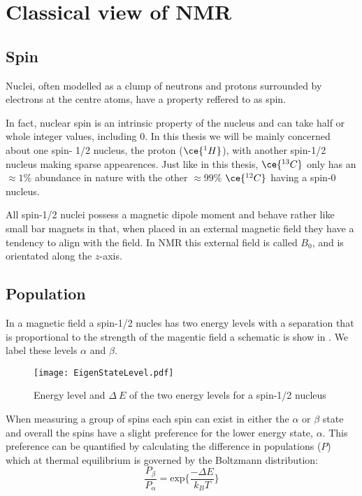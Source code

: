 
\section{Classical view of NMR}

\subsection{Spin}

Nuclei, often modelled as a clump of neutrons and protons surrounded by electrons at
the centre atoms, have a property reffered to as spin.

In fact, nuclear spin is an intrinsic property of the nucleus and can take half or whole
integer values, including $0$. In this thesis we will be mainly concerned about one spin-
1/2 nucleus, the proton ($\ce{^{1}H}$), with another spin-1/2 nucleus  making
sparse appearences. Just like in this thesis, $\ce{^{13}C}$ only has an $\approx{1}\%$
abundance in nature with the other $\approx{99}\%$ $\ce{^{12}C}$ having a spin-$0$
nucleus.

All spin-1/2 nuclei possess a magnetic dipole moment and behave rather like small bar magnets in that, when placed in an external magnetic field they have a tendency to align
with the field. In NMR this external field is called $B_0$, and is orientated along the
$z$-axis.

\subsection{Population}

In a magnetic field a spin-1/2 nucles has two energy levels with a separation that is proportional to the strength of the magentic field a schematic is show in . We label these levels $\alpha$ and $\beta$.

\begin{figure}
  \begin{center}
  \texttt{[image: EigenStateLevel.pdf]}
  \end{center}
  \caption{Energy level and $\Delta~E$ of the two energy levels for a spin-1/2 nucleus}
  \label{fig:EnergySplit}
\end{figure}

When measuring a group of spins each spin can exist in either the $\alpha$ or $\beta$ state and overall the spins have a slight preference for the lower energy state, $\alpha$. This preference can be quantified by calculating the difference in populations ($P$) which at thermal equilibrium is governed by the Boltzmann distribution:
\begin{equation}
  \frac{P_{\beta}}{P_{\alpha}} = \text{exp}\{\frac{-\Delta{E}}{k_B T}\}
\end{equation}

